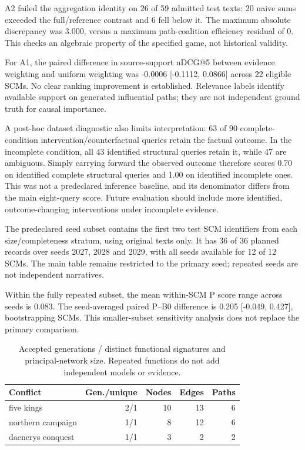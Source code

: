 \documentclass{svproc}
\begin{document}
A2 failed the aggregation identity on 26 of 59 admitted test texts: 20 naive sums exceeded the full/reference contrast and 6 fell below it. The maximum absolute discrepancy was 3.000, versus a maximum path-coalition efficiency residual of 0. This checks an algebraic property of the specified game, not historical validity.

For A1, the paired difference in source-support nDCG@5 between evidence weighting and uniform weighting was -0.0006 [-0.1112, 0.0866] across 22 eligible SCMs. No clear ranking improvement is established. Relevance labels identify available support on generated influential paths; they are not independent ground truth for causal importance.

A post-hoc dataset diagnostic also limits interpretation: 63 of 90 complete-condition intervention/counterfactual queries retain the factual outcome. In the incomplete condition, all 43 identified structural queries retain it, while 47 are ambiguous. Simply carrying forward the observed outcome therefore scores 0.70 on identified complete structural queries and 1.00 on identified incomplete ones. This was not a predeclared inference baseline, and its denominator differs from the main eight-query score. Future evaluation should include more identified, outcome-changing interventions under incomplete evidence.

The predeclared seed subset contains the first two test SCM identifiers from each size/completeness stratum, using original texts only. It has 36 of 36 planned records over seeds 2027, 2028 and 2029, with all seeds available for 12 of 12 SCMs. The main table remains restricted to the primary seed; repeated seeds are not independent narratives.

Within the fully repeated subset, the mean within-SCM P score range across seeds is 0.083. The seed-averaged paired P--B0 difference is 0.205 [-0.049, 0.427], bootstrapping SCMs. This smaller-subset sensitivity analysis does not replace the primary comparison.



\begin{table}[t]\centering\caption{Accepted generations / distinct functional signatures and principal-network size. Repeated functions do not add independent models or evidence.}
\begin{tabular}{lrrrr}\toprule Conflict & Gen./unique & Nodes & Edges & Paths \\\midrule
five kings & 2/1 & 10 & 13 & 6 \\
northern campaign & 1/1 & 8 & 12 & 6 \\
daenerys conquest & 1/1 & 3 & 2 & 2 \\
\bottomrule\end{tabular}\end{table}
\end{document}
